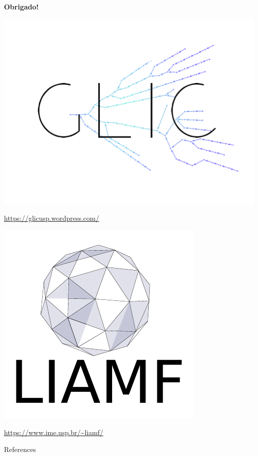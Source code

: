 \documentclass[10pt]{beamer}
\begin{document}
\begin{frame}
\begin{center}
\textbf{\LARGE{Obrigado!}}
\end{center}

\vspace{0.3cm}

\begin{center}
\includegraphics[scale=0.15]{images/gliclogo.pdf}
\end{center}
\url{https://glicusp.wordpress.com/}

\vspace{0.3cm}

\begin{center}
\includegraphics[scale=0.3]{images/logo0.pdf}
\end{center}
\url{https://www.ime.usp.br/~liamf/}

\end{frame}


\begin{frame}[allowframebreaks]{References}

  
  

\end{frame}
\end{document}
